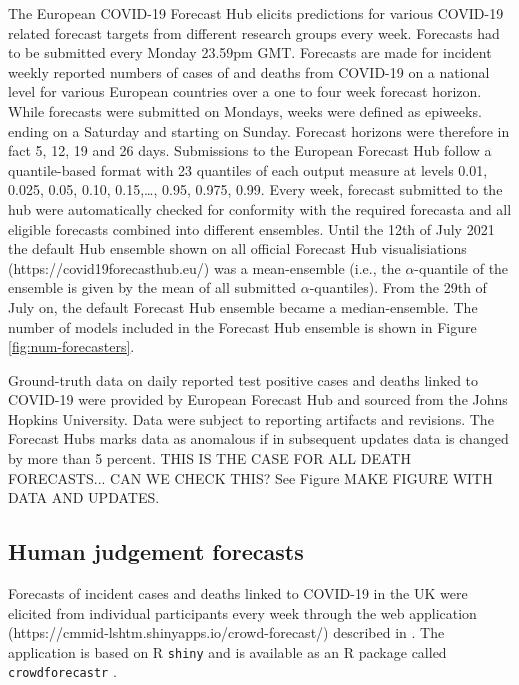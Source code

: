 \documentclass[10pt,a4paper,twocolumn]{article}
\begin{document}
The European COVID-19 Forecast Hub \cite{sherrattPredictivePerformanceMultimodel2022a} elicits predictions for various COVID-19 related forecast targets from different research groups every week. Forecasts had to be submitted every Monday 23.59pm GMT. Forecasts are made for incident weekly reported numbers of cases of and deaths from COVID-19 on a national level for various European countries over a one to four week forecast horizon. While forecasts were submitted on Mondays, weeks were defined as epiweeks. ending on a Saturday and starting on Sunday. Forecast horizons were therefore in fact 5, 12, 19 and 26 days. Submissions to the European Forecast Hub follow a quantile-based format with 23 quantiles of each output measure at levels 0.01, 0.025, 0.05, 0.10, 0.15,…, 0.95, 0.975, 0.99.
Every week, forecast submitted to the hub were automatically checked for conformity with the required forecasta and all eligible forecasts combined into different ensembles. Until the 12th of July 2021 the default Hub ensemble shown on all official Forecast Hub visualisiations (https://covid19forecasthub.eu/) was a mean-ensemble (i.e., the $\alpha$-quantile of the ensemble is given by the mean of all submitted $\alpha$-quantiles). From the 29th of July on, the default Forecast Hub ensemble became a median-ensemble. The number of models included in the Forecast Hub ensemble is shown in Figure \ref{fig:num-forecasters}. 

Ground-truth data on daily reported test positive cases and deaths linked to COVID-19 were provided by European Forecast Hub and sourced from the Johns Hopkins University. Data were subject to reporting artifacts and revisions. The Forecast Hubs marks data as anomalous if in subsequent updates data is changed by more than 5 percent. THIS IS THE CASE FOR ALL DEATH FORECASTS... CAN WE CHECK THIS? 
See Figure MAKE FIGURE WITH DATA AND UPDATES. 

\subsection*{Human judgement forecasts}

Forecasts of incident cases and deaths linked to COVID-19 in the UK were elicited from individual participants every week through the web application (https://cmmid-lshtm.shinyapps.io/crowd-forecast/) described in \cite{bosseComparingHumanModelbased2022}. The application is based on \textsf{R} \cite{R} \texttt{shiny} \cite{shiny} and is available as an \textsf{R} package called \texttt{crowdforecastr} \citep{crowdforecastr}. 
\end{document}

